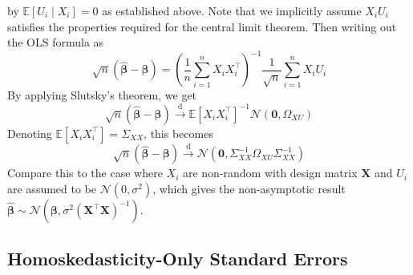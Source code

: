 \documentclass[11pt]{report} %
\begin{document}
by $\mathbb{E}\left[U_{i}\middle| X_{i}\right] = 0$ as established above. Note that we implicitly assume $X_{i}U_{i}$ satisfies the properties required for the central limit theorem. Then writing out the OLS formula as
\begin{equation}
\sqrt{n}\left(\widehat{\boldsymbol{\beta}} - \boldsymbol{\beta}\right) = \left(\dfrac{1}{n}\sum_{i=1}^{n}X_{i}X_{i}^{\top}\right)^{-1}\dfrac{1}{\sqrt{n}}\sum_{i=1}^{n}X_{i}U_{i}
\end{equation}
By applying Slutsky's theorem, we get
\begin{equation}
\sqrt{n}\left(\widehat{\boldsymbol{\beta}} - \boldsymbol{\beta}\right) \overset{\mathrm{d}}{\to} \mathbb{E}\left[X_{i}X_{i}^{\top}\right]^{-1}\mathcal{N}\left(\mathbf{0}, \Omega_{XU}\right)
\end{equation}
Denoting $\mathbb{E}\left[X_{i}X_{i}^{\top}\right] = \Sigma_{XX}$, this becomes
\begin{equation}
\sqrt{n}\left(\widehat{\boldsymbol{\beta}} - \boldsymbol{\beta}\right) \overset{\mathrm{d}}{\to} \mathcal{N}\left(\mathbf{0}, \Sigma_{XX}^{-1}\Omega_{XU}\Sigma_{XX}^{-1}\right)
\end{equation}
Compare this to the case where $X_{i}$ are non-random with design matrix $\mathbf{X}$ and $U_{i}$ are assumed to be $\mathcal{N}\left(0, \sigma^{2}\right)$, which gives the non-asymptotic result $\widehat{\boldsymbol{\beta}} \sim \mathcal{N}\left(\boldsymbol{\beta}, \sigma^{2}\left(\mathbf{X}^{\top}\mathbf{X}\right)^{-1}\right)$.

\subsection{Homoskedasticity-Only Standard Errors}
\end{document}
